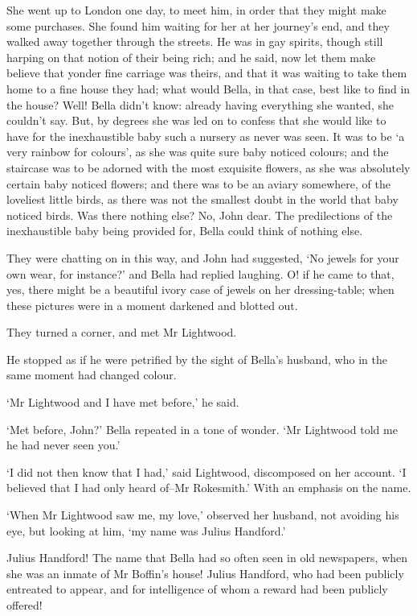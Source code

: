 She went up to London one day, to meet him, in order that they might
make some purchases. She found him waiting for her at her journey’s
end, and they walked away together through the streets. He was in gay
spirits, though still harping on that notion of their being rich; and
he said, now let them make believe that yonder fine carriage was theirs,
and that it was waiting to take them home to a fine house they had; what
would Bella, in that case, best like to find in the house? Well! Bella
didn’t know: already having everything she wanted, she couldn’t say.
But, by degrees she was led on to confess that she would like to have
for the inexhaustible baby such a nursery as never was seen. It was
to be ‘a very rainbow for colours’, as she was quite sure baby noticed
colours; and the staircase was to be adorned with the most exquisite
flowers, as she was absolutely certain baby noticed flowers; and there
was to be an aviary somewhere, of the loveliest little birds, as there
was not the smallest doubt in the world that baby noticed birds.
Was there nothing else? No, John dear. The predilections of the
inexhaustible baby being provided for, Bella could think of nothing
else.

They were chatting on in this way, and John had suggested, ‘No jewels
for your own wear, for instance?’ and Bella had replied laughing. O! if
he came to that, yes, there might be a beautiful ivory case of jewels
on her dressing-table; when these pictures were in a moment darkened and
blotted out.

They turned a corner, and met Mr Lightwood.

He stopped as if he were petrified by the sight of Bella’s husband, who
in the same moment had changed colour.

‘Mr Lightwood and I have met before,’ he said.

‘Met before, John?’ Bella repeated in a tone of wonder. ‘Mr Lightwood
told me he had never seen you.’

‘I did not then know that I had,’ said Lightwood, discomposed on her
account. ‘I believed that I had only heard of--Mr Rokesmith.’ With an
emphasis on the name.

‘When Mr Lightwood saw me, my love,’ observed her husband, not avoiding
his eye, but looking at him, ‘my name was Julius Handford.’

Julius Handford! The name that Bella had so often seen in old
newspapers, when she was an inmate of Mr Boffin’s house! Julius
Handford, who had been publicly entreated to appear, and for
intelligence of whom a reward had been publicly offered!

